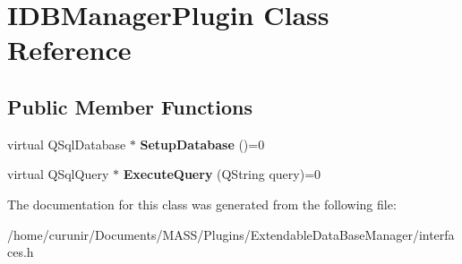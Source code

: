 \hypertarget{class_i_d_b_manager_plugin}{}\section{I\+D\+B\+Manager\+Plugin Class Reference}
\label{class_i_d_b_manager_plugin}
\subsection*{Public Member Functions}
\begin{DoxyCompactItemize}
\item 
virtual Q\+Sql\+Database $\ast$ {\bfseries Setup\+Database} ()=0\hypertarget{class_i_d_b_manager_plugin_add096dcc73790ff4230a44816090d989}{}\label{class_i_d_b_manager_plugin_add096dcc73790ff4230a44816090d989}

\item 
virtual Q\+Sql\+Query $\ast$ {\bfseries Execute\+Query} (Q\+String query)=0\hypertarget{class_i_d_b_manager_plugin_acc0927a1751a2f1d0d87b9b324db17e7}{}\label{class_i_d_b_manager_plugin_acc0927a1751a2f1d0d87b9b324db17e7}

\end{DoxyCompactItemize}


The documentation for this class was generated from the following file\+:\begin{DoxyCompactItemize}
\item 
/home/curunir/\+Documents/\+M\+A\+S\+S/\+Plugins/\+Extendable\+Data\+Base\+Manager/interfaces.\+h\end{DoxyCompactItemize}
